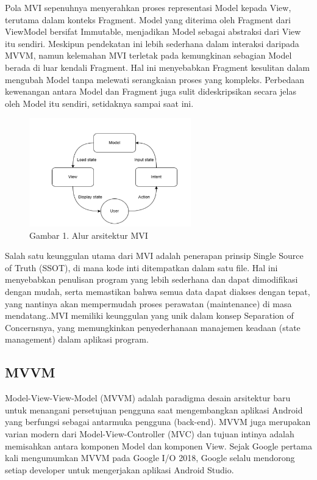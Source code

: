\documentclass[conference]{IEEEtran}
\begin{document}
\indent Pola MVI sepenuhnya menyerahkan proses representasi Model kepada View, terutama dalam konteks Fragment. Model yang diterima oleh Fragment dari ViewModel bersifat Immutable, menjadikan Model sebagai abstraksi dari View itu sendiri\cite{nunkesser2023choosing}. Meskipun pendekatan ini lebih sederhana dalam interaksi daripada MVVM, namun kelemahan MVI terletak pada kemungkinan sebagian Model berada di luar kendali Fragment. Hal ini menyebabkan Fragment kesulitan dalam mengubah Model tanpa melewati serangkaian proses yang kompleks. Perbedaan kewenangan antara Model dan Fragment juga sulit dideskripsikan secara jelas oleh Model itu sendiri, setidaknya sampai saat ini.

\begin{figure}[htp]
    \centering
    \includegraphics[width=7cm]{image/MVI.png}
    \caption{Gambar 1. Alur arsitektur MVI}
    \label{fig:mvi}
\end{figure}

\indent Salah satu keunggulan utama dari MVI adalah penerapan prinsip Single Source of Truth (SSOT), di mana kode inti ditempatkan dalam satu file. Hal ini menyebabkan penulisan program yang lebih sederhana dan dapat dimodifikasi dengan mudah, serta memastikan bahwa semua data dapat diakses dengan tepat, yang nantinya akan mempermudah proses perawatan (maintenance) di masa mendatang.\cite{arif2021optimasi}.MVI memiliki keunggulan yang unik dalam konsep Separation of Concernsnya, yang memungkinkan penyederhanaan manajemen keadaan (state management) dalam aplikasi program.

\subsection{MVVM}
\indent Model-View-View-Model (MVVM) adalah paradigma desain arsitektur baru untuk menangani persetujuan pengguna saat mengembangkan aplikasi Android yang berfungsi sebagai antarmuka pengguna (back-end). MVVM juga merupakan varian modern dari Model-View-Controller (MVC) dan tujuan intinya adalah memisahkan antara komponen Model dan komponen View\cite{rasyid2022sistem}. Sejak Google pertama kali mengumumkan MVVM pada Google I/O 2018, Google selalu mendorong setiap developer untuk mengerjakan aplikasi Android Studio.\cite{maulana2022aplikasi}
\end{document}
